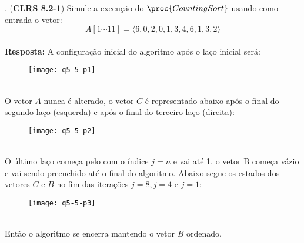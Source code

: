 
. (\textbf{CLRS 8.2-1}) Simule a execução do $\proc{CountingSort}$ 
usando como entrada o vetor:
\[ A[1 \cdots 11] = \langle6, 0, 2, 0, 1, 3, 4, 6, 1, 3, 2\rangle  \]
\\ [6pt]
\textbf{Resposta:} A configuração inicial do algoritmo após o laço inicial será:
\begin{figure}[h]
  \centering
    \texttt{[image: q5-5-p1]}
\end{figure}
\\
O vetor $A$ nunca é alterado, o vetor $C$ é representado abaixo após o final do 
segundo laço (esquerda) e após o final do terceiro laço (direita):
\begin{figure}[h]
  \centering
    \texttt{[image: q5-5-p2]}
\end{figure}
\\
O último laço começa pelo com o índice $j = n$ e vai até 1, o vetor B começa 
vázio e vai sendo preenchido até o final do algoritmo. Abaixo segue os estados 
dos vetores $C$ e $B$ no fim das iterações $j = 8, j = 4$ e $j = 1$:
\begin{figure}[h]
  \centering
    \texttt{[image: q5-5-p3]}
\end{figure}
\\
Então o algoritmo se encerra mantendo o vetor $B$ ordenado.
\\[12pt]
